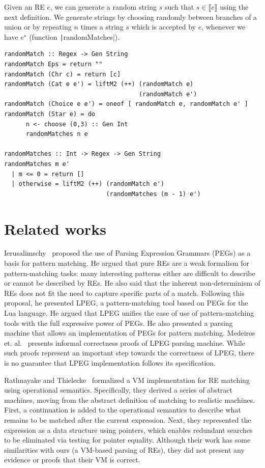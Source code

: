 \documentclass[review]{elsarticle}
\newcommand{\sembrackets}[1]{\ensuremath{\llbracket #1 \rrbracket}}
\newcommand{\haskell}[1]{\texttt|#1|}
\theoremstyle{definition}
\begin{document}
Given an RE $e$, we can generate a random string $s$ such that $s \in\sembrackets{e}$
using the next definition. We generate strings by choosing randomly between branches of
a union or by repeating $n$ times a string $s$ which is accepted by $e$, whenever we
have $e^\star$ (function \haskell{randomMatches}).

\begin{verbatim}
randomMatch :: Regex -> Gen String
randomMatch Eps = return ""
randomMatch (Chr c) = return [c]
randomMatch (Cat e e') = liftM2 (++) (randomMatch e)
                                     (randomMatch e')
randomMatch (Choice e e') = oneof [ randomMatch e, randomMatch e' ]
randomMatch (Star e) = do
      n <- choose (0,3) :: Gen Int
      randomMatches n e

randomMatches :: Int -> Regex -> Gen String
randomMatches m e'
  | m <= 0 = return []
  | otherwise = liftM2 (++) (randomMatch e')
                            (randomMatches (m - 1) e')
\end{verbatim}

\section{Related works}\label{section:related}

Ierusalimschy~\cite{Ierusalimschy2009} proposed the use of Parsing Expression Grammars (PEGs) as a basis
for pattern matching. He argued that pure REs are a weak formalism for pattern-matching tasks:
many interesting patterns either are difficult to describe or cannot be described by REs. He also said
that the inherent non-determinism of REs does not fit the need to capture specific parts of a match. Following
this proposal, he presented LPEG, a pattern-matching tool based on PEGs for the Lua language. He
argued that LPEG unifies the ease of use of pattern-matching tools with the full expressive power of PEGs.
He also presented a parsing machine that allows an implementation of PEGs for pattern matching.
Medeiros et. al.~\cite{Medeiros2008} presents informal correctness proofs of LPEG parsing machine.
While such proofs represent an important step towards the correctness of LPEG, there is no guarantee that LPEG
implementation follows its specification.

Rathnayake and Thielecke~\cite{Rathnayake2011} formalized a VM implementation for RE matching using
operational semantics. Specifically, they derived a series of abstract machines, moving from the abstract
definition of matching to realistic machines. First, a continuation is added to the operational semantics
to describe what remains to be matched after the current expression. Next, they represented the expression
as a data structure using pointers, which enables redundant searches to be eliminated via testing for pointer
equality. Although their work has some similarities with ours (a VM-based parsing of REs), they did not present
any evidence or proofs that their VM is correct.
\end{document}
